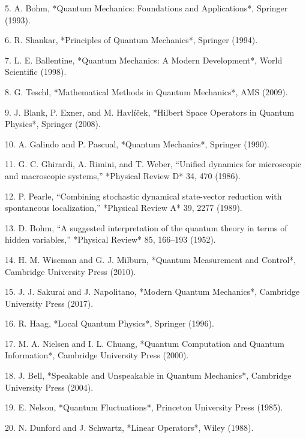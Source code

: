 \documentclass[11pt]{article}
\begin{document}
5. A. Bohm, *Quantum Mechanics: Foundations and Applications*, Springer (1993).

6. R. Shankar, *Principles of Quantum Mechanics*, Springer (1994).

7. L. E. Ballentine, *Quantum Mechanics: A Modern Development*, World Scientific (1998).

8. G. Teschl, *Mathematical Methods in Quantum Mechanics*, AMS (2009).

9. J. Blank, P. Exner, and M. Havlíček, *Hilbert Space Operators in Quantum Physics*, Springer (2008).

10. A. Galindo and P. Pascual, *Quantum Mechanics*, Springer (1990).

11. G. C. Ghirardi, A. Rimini, and T. Weber, “Unified dynamics for microscopic and macroscopic systems,” *Physical Review D* 34, 470 (1986).

12. P. Pearle, “Combining stochastic dynamical state-vector reduction with spontaneous localization,” *Physical Review A* 39, 2277 (1989).

13. D. Bohm, “A suggested interpretation of the quantum theory in terms of hidden variables,” *Physical Review* 85, 166–193 (1952).

14. H. M. Wiseman and G. J. Milburn, *Quantum Measurement and Control*, Cambridge University Press (2010).

15. J. J. Sakurai and J. Napolitano, *Modern Quantum Mechanics*, Cambridge University Press (2017).

16. R. Haag, *Local Quantum Physics*, Springer (1996).

17. M. A. Nielsen and I. L. Chuang, *Quantum Computation and Quantum Information*, Cambridge University Press (2000).

18. J. Bell, *Speakable and Unspeakable in Quantum Mechanics*, Cambridge University Press (2004).

19. E. Nelson, *Quantum Fluctuations*, Princeton University Press (1985).

20. N. Dunford and J. Schwartz, *Linear Operators*, Wiley (1988).
\end{document}
